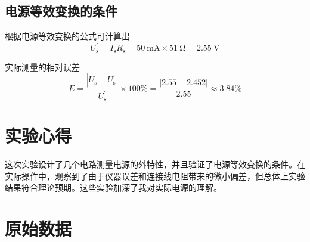 \documentclass[a4paper,utf8]{article}
\begin{document}
\subsection{电源等效变换的条件}
根据电源等效变换的公式可计算出
\begin{equation}
    U^{'}_\text{s}=I_\text{s} R_\text{s} = \SI{50}{\mA} \times \SI{51}{\ohm} = \SI{2.55}{\V}
\end{equation}\par
实际测量的相对误差
\begin{equation}
    E=\frac{\left|U_\text{s}-U^{'}_\text{s}\right|}{U^{'}_\text{s}}\times 100 \% =\frac{\left|2.55-2.452\right|}{2.55}\approx 3.84\%
\end{equation}
\section{实验心得}
这次实验设计了几个电路测量电源的外特性，并且验证了电源等效变换的条件。在实际操作中，观察到了由于仪器误差和连接线电阻带来的微小偏差，但总体上实验结果符合理论预期。这些实验加深了我对实际电源的理解。
\section{原始数据}
\begin{center}
\end{center}
\end{document}
